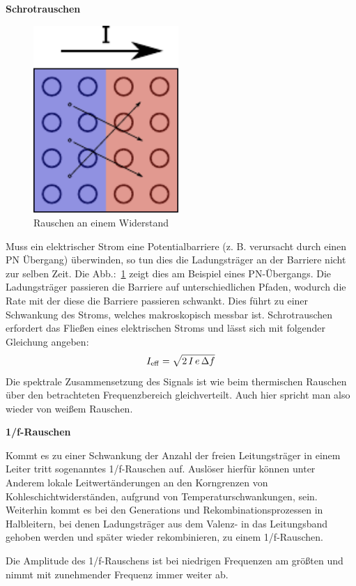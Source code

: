 \textbf{Schrotrauschen}

\begin{figure}
  \centering
  \includegraphics[clip, width=0.49\textwidth]
  {./../common/bilder/schrotrauschen.pdf}
  \caption{Rauschen an einem Widerstand}\label{FIG:SHOTNOISE}
\end{figure}
Muss ein elektrischer Strom eine Potentialbarriere (z. B. verursacht 
durch einen PN Übergang) überwinden, so tun dies die Ladungsträger an der 
Barriere nicht zur selben Zeit. Die Abb.:~\ref{FIG:SHOTNOISE} zeigt dies
am Beispiel eines PN-Übergangs.
Die Ladungsträger passieren die Barriere auf unterschiedlichen Pfaden, 
wodurch die Rate mit der diese die Barriere passieren schwankt.
Dies führt zu einer Schwankung des Stroms, welches makroskopisch messbar ist.
Schrotrauschen erfordert das Fließen eines elektrischen Stroms und lässt sich 
mit folgender Gleichung angeben\cite[S. 541]{Art:SCHOTTKY}:
\[I_{\rm eff} = \sqrt{2\,I\,e\,\Delta f }\]
Die spektrale Zusammensetzung des Signals ist wie beim thermischen Rauschen
über den betrachteten Frequenzbereich gleichverteilt.
Auch hier spricht man also wieder von weißem Rauschen. 

\textbf{1/f-Rauschen}

Kommt es zu einer Schwankung der Anzahl der freien Leitungsträger
in einem Leiter tritt sogenanntes 1/f-Rauschen auf.
Auslöser hierfür können unter Anderem lokale Leitwertänderungen an den 
Korngrenzen von Kohleschichtwiderständen, aufgrund von Temperaturschwankungen, 
sein. Weiterhin kommt es bei den Generations und Rekombinationsprozessen in
Halbleitern, bei denen Ladungsträger aus dem Valenz- in das Leitungsband 
gehoben werden und später wieder rekombinieren, zu einem 
1/f-Rauschen.\cite[S.29]{BK:SENSORNOISE}

Die Amplitude des 1/f-Rauschens ist bei niedrigen Frequenzen am größten und
nimmt mit zunehmender Frequenz immer weiter ab.